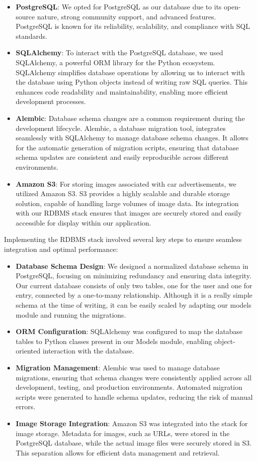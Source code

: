 \begin{itemize}
    \item \textbf{PostgreSQL}: We opted for PostgreSQL as our database due to its open-source nature, strong community support, and advanced features. PostgreSQL is known for its reliability, scalability, and compliance with SQL standards.
    \item \textbf{SQLAlchemy}: To interact with the PostgreSQL database, we used SQLAlchemy, a powerful ORM library for the Python ecosystem. SQLAlchemy simplifies database operations by allowing us to interact with the database using Python objects instead of writing raw SQL queries. This enhances code readability and maintainability, enabling more efficient development processes.
    \item \textbf{Alembic}: Database schema changes are a common requirement during the development lifecycle. Alembic, a database migration tool, integrates seamlessly with SQLAlchemy to manage database schema changes. It allows for the automatic generation of migration scripts, ensuring that database schema updates are consistent and easily reproducible across different environments.
    \item \textbf{Amazon S3}: For storing images associated with car advertisements, we utilized Amazon S3. S3 provides a highly scalable and durable storage solution, capable of handling large volumes of image data. Its integration with our RDBMS stack ensures that images are securely stored and easily accessible for display within our application.
\end{itemize}

Implementing the RDBMS stack involved several key steps to ensure seamless integration and optimal performance:

\begin{itemize}
    \item \textbf{Database Schema Design}: We designed a normalized database schema in PostgreSQL, focusing on minimizing redundancy and ensuring data integrity. Our current database consists of only two tables, one for the user and one for entry, connected by a one-to-many relationship. Although it is a really simple schema at the time of writing, it can be easily scaled by adapting our models module and running the migrations.
    \item \textbf{ORM Configuration}: SQLAlchemy was configured to map the database tables to Python classes present in our Models module, enabling object-oriented interaction with the database.
    \item \textbf{Migration Management}: Alembic was used to manage database migrations, ensuring that schema changes were consistently applied across all development, testing, and production environments. Automated migration scripts were generated to handle schema updates, reducing the risk of manual errors.
    \item \textbf{Image Storage Integration}: Amazon S3 was integrated into the stack for image storage. Metadata for images, such as URLs, were stored in the PostgreSQL database, while the actual image files were securely stored in S3. This separation allows for efficient data management and retrieval.
\end{itemize}

